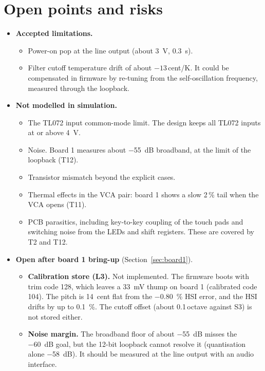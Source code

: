 \documentclass[11pt,a4paper]{article}
\begin{document}
\section{Open points and risks}\label{sec:open}
\begin{itemize}
  \item \textbf{Accepted limitations.}
  \begin{itemize}
    \item Power-on pop at the line output (about \SI{3}{V}, \SI{0.3}{s}).
    \item Filter cutoff temperature drift of about $-13$\,cent/K. It could be compensated in firmware by
      re-tuning from the self-oscillation frequency, measured through the loopback.
  \end{itemize}
  \item \textbf{Not modelled in simulation.}
  \begin{itemize}
    \item The TL072 input common-mode limit. The design keeps all TL072 inputs at or above \SI{4}{V}.
    \item Noise. Board 1 measures about \SI{-55}{dB} broadband, at the limit of the loopback (T12).
    \item Transistor mismatch beyond the explicit cases.
    \item Thermal effects in the VCA pair: board 1 shows a slow 2\,\% tail when the VCA opens (T11).
    \item PCB parasitics, including key-to-key coupling of the touch pads and switching noise from the
      LEDs and shift registers. These are covered by T2 and T12.
  \end{itemize}
  \item \textbf{Open after board 1 bring-up} (Section~\ref{sec:board1}).
  \begin{itemize}
    \item \textbf{Calibration store (L3).} Not implemented. The firmware boots with trim code 128, which
      leaves a \SI{33}{mV} thump on board 1 (calibrated code 104). The pitch is \SI{14}{cent} flat from the
      \SI{-0.80}{\percent} HSI error, and the HSI drifts by up to \SI{0.1}{\percent}. The cutoff offset
      (about 0.1\,octave against S3) is not stored either.
    \item \textbf{Noise margin.} The broadband floor of about \SI{-55}{dB} misses the \SI{-60}{dB} goal, but
      the 12-bit loopback cannot resolve it (quantisation alone \SI{-58}{dB}). It should be measured at the
      line output with an audio interface.

\end{itemize}
\end{itemize}
\end{document}
